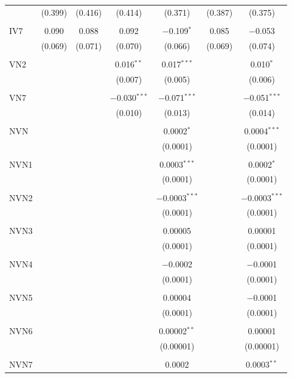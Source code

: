 \begin{table}[!htbp]
\begin{tabular}{@{\extracolsep{5pt}}lcccccc}
  & (0.399) & (0.416) & (0.414) & (0.371) & (0.387) & (0.375) \\ 
  & & & & & & \\ 
 IV7 & 0.090 & 0.088 & 0.092 & $-$0.109$^{*}$ & 0.085 & $-$0.053 \\ 
  & (0.069) & (0.071) & (0.070) & (0.066) & (0.069) & (0.074) \\ 
  & & & & & & \\ 
 VN2 &  &  & 0.016$^{**}$ & 0.017$^{***}$ &  & 0.010$^{*}$ \\ 
  &  &  & (0.007) & (0.005) &  & (0.006) \\ 
  & & & & & & \\ 
 VN7 &  &  & $-$0.030$^{***}$ & $-$0.071$^{***}$ &  & $-$0.051$^{***}$ \\ 
  &  &  & (0.010) & (0.013) &  & (0.014) \\ 
  & & & & & & \\ 
 NVN &  &  &  & 0.0002$^{*}$ &  & 0.0004$^{***}$ \\ 
  &  &  &  & (0.0001) &  & (0.0001) \\ 
  & & & & & & \\ 
 NVN1 &  &  &  & 0.0003$^{***}$ &  & 0.0002$^{*}$ \\ 
  &  &  &  & (0.0001) &  & (0.0001) \\ 
  & & & & & & \\ 
 NVN2 &  &  &  & $-$0.0003$^{***}$ &  & $-$0.0003$^{***}$ \\ 
  &  &  &  & (0.0001) &  & (0.0001) \\ 
  & & & & & & \\ 
 NVN3 &  &  &  & 0.00005 &  & 0.00001 \\ 
  &  &  &  & (0.0001) &  & (0.0001) \\ 
  & & & & & & \\ 
 NVN4 &  &  &  & $-$0.0002 &  & $-$0.0001 \\ 
  &  &  &  & (0.0001) &  & (0.0001) \\ 
  & & & & & & \\ 
 NVN5 &  &  &  & 0.00004 &  & $-$0.0001 \\ 
  &  &  &  & (0.0001) &  & (0.0001) \\ 
  & & & & & & \\ 
 NVN6 &  &  &  & 0.00002$^{**}$ &  & 0.00001 \\ 
  &  &  &  & (0.00001) &  & (0.00001) \\ 
  & & & & & & \\ 
 NVN7 &  &  &  & 0.0002 &  & 0.0003$^{**}$ \\ 

\end{tabular}
\end{table}
